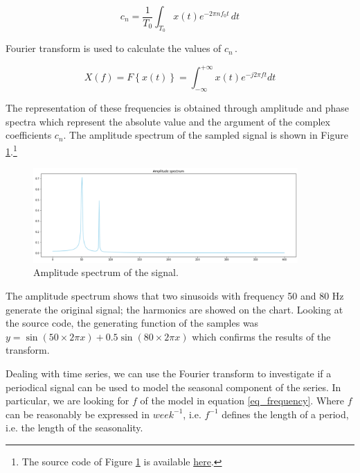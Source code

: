\begin{equation}
c_n=\frac{1}{T_0}\int_{T_0}{x\left(t\right)e^{-2\pi n f_0t\ }dt}
\label{eq_FourierCoefficients}
\end{equation}

Fourier transform is used to calculate the values of $c_{n\ }$.

\begin{equation}
X\left(f\right)=F\left\{x\left(t\right)\right\}=\int_{-\infty}^{+\infty}{x\left(t\right)e^{-j2\pi ft}}dt
\label{eq_Fouriertransform}
\end{equation}

The representation of these frequencies is obtained through amplitude and phase spectra which represent the absolute value and the argument of the complex coefficients $c_n$. The amplitude spectrum of the sampled signal is shown in Figure \ref{fig_Fourier}.\footnote{The source code of Figure \ref{fig_Fourier} is available \href{https://github.com/aletuf93/logproj/blob/master/examples/03.\%20Statistics.ipynb}{here}.}

\begin{figure}[hbt!]
\centering
\includegraphics[width=0.9\textwidth]{SectionLetsMath/elemStat_figures/fig_Fourier.png}
\captionsetup{type=figure}
\caption{Amplitude spectrum of the signal.}
\label{fig_Fourier}
\end{figure}

The amplitude spectrum shows that two sinusoids with frequency 50 and 80 Hz generate the original signal; the harmonics are showed on the chart. Looking at the source code, the generating function of the samples was $y=\sin{\left(50 \times 2\pi x\right)}+0.5\sin(80\times2\pi x)$ which confirms the results of the transform.\par

Dealing with time series, we can use the Fourier transform to investigate if a periodical signal can be used to model the seasonal component of the series. In particular, we are looking for $f$ of the model in equation \ref{eq_frequency}. Where $f$ can be reasonably be expressed in $week^{-1}$, i.e. $f^{-1}$ defines the length of a period, i.e. the length of the seasonality.\par

